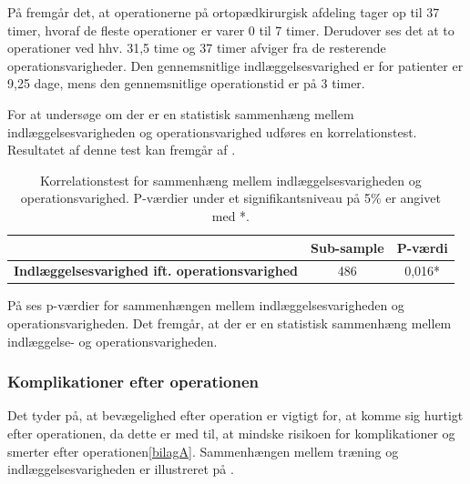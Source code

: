 \noindent
På  fremgår det, at operationerne på ortopædkirurgisk afdeling tager op til 37 timer, hvoraf de fleste operationer er varer 0 til 7 timer. Derudover ses det at to operationer ved hhv. 31,5 time og 37 timer afviger fra de resterende operationsvarigheder. Den gennemsnitlige indlæggelsesvarighed er for patienter er 9,25 dage, mens den gennemsnitlige operationstid er på 3 timer. 

For at undersøge om der er en statistisk sammenhæng mellem indlæggelsesvarigheden og operationsvarighed udføres en korrelationstest. Resultatet af denne test kan fremgår af .

\begin{table}[H]
\centering
\begin{tabular}{|c|c|c|}
\hline
\textbf{}                                             & \textbf{Sub-sample} & \textbf{P-værdi} \\ \hline
\textbf{Indlæggelsesvarighed ift. operationsvarighed} & 486                 & 0,016*           \\ \hline
\end{tabular}
\caption{Korrelationstest for sammenhæng mellem indlæggelsesvarigheden og operationsvarighed. P-værdier under et signifikantsniveau på 5\% er angivet med *.}
\label{opogindlaegtab}
\end{table}

\noindent
På  ses p-værdier for sammenhængen mellem indlæggelsesvarigheden og operationsvarigheden. Det fremgår, at der er en statistisk sammenhæng mellem indlæggelse- og operationsvarigheden. 

\subsubsection{Komplikationer efter operationen}
Det tyder på, at bevægelighed efter operation er vigtigt for, at komme sig hurtigt efter operationen, da dette er med til, at mindske risikoen for komplikationer og smerter efter operationen\ref{bilagA}\cite{Nordjylland2014}. Sammenhængen mellem træning og indlæggelsesvarigheden er illustreret på .

